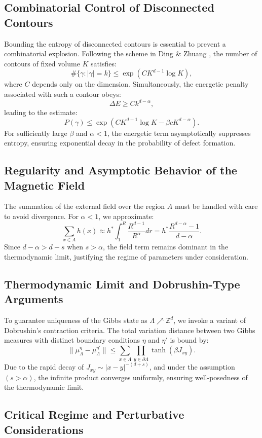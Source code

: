 \documentclass{article}
\begin{document}
\subsection{Combinatorial Control of Disconnected Contours}

Bounding the entropy of disconnected contours is essential to prevent a combinatorial explosion. Following the scheme in Ding \& Zhuang \cite{ding2024}, the number of contours of fixed volume $K$ satisfies:
\[
\#\{\gamma : |\gamma|=k\} \leq \exp(CK^{d-1}\log K),
\]
where $C$ depends only on the dimension. Simultaneously, the energetic penalty associated with such a contour obeys:
\[
\Delta E \geq Ck^{d-\alpha},
\]
leading to the estimate:
\[
P(\gamma) \leq \exp(CK^{d-1}\log K - \beta cK^{d-\alpha}).
\]
For sufficiently large $\beta$ and $\alpha<1$, the energetic term asymptotically suppresses entropy, ensuring exponential decay in the probability of defect formation.

\subsection{Regularity and Asymptotic Behavior of the Magnetic Field}

The summation of the external field over the region $A$ must be handled with care to avoid divergence. For $\alpha<1$, we approximate:
\[
\sum_{x\in A} h(x) \approx h^* \int_1^R \frac{R^{d-1}}{R^\alpha} dr = h^* \frac{R^{d-\alpha}-1}{d-\alpha}.
\]
Since $d-\alpha>d-s$ when $s>\alpha$, the field term remains dominant in the thermodynamic limit, justifying the regime of parameters under consideration.

\subsection{Thermodynamic Limit and Dobrushin-Type Arguments}
\hypertarget{pag8}{}
To guarantee uniqueness of the Gibbs state as $\Lambda \nearrow \mathbb{Z}^d$, we invoke a variant of Dobrushin's contraction criteria. The total variation distance between two Gibbs measures with distinct boundary conditions $\eta$ and $\eta'$ is bound by:
\[
\|\mu_\Lambda^\eta - \mu_\Lambda^{\eta'}\| \leq \sum_{x\in\Lambda} \prod_{y\in\partial\Lambda} \tanh(\beta J_{xy}).
\]
Due to the rapid decay of $J_{xy} \sim |x-y|^{-(d+s)}$, and under the assumption $(s>\alpha)$, the infinite product converges uniformly, ensuring well-posedness of the thermodynamic limit.

\subsection{Critical Regime and Perturbative Considerations}
\end{document}
